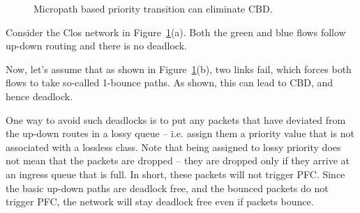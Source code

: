 \begin{figure}[t]
	\centering
	

	
	
	\caption{Micropath based priority transition can eliminate CBD.}\label{fig:priority_transition}
\end{figure}

Consider the Clos network in Figure~\ref{fig:priority_transition}(a). Both the
green and blue flows follow up-down routing and there is no deadlock. 

Now, let's assume that as shown in Figure~\ref{fig:priority_transition}(b), two
links fail, which forces both flows to take so-called 1-bounce paths. As shown,
this can lead to CBD, and hence deadlock.

One way to avoid such deadlocks is to put any packets that have deviated from
the up-down routes in a lossy queue -- i.e. assign them a priority value that is
not associated with a lossless class.  Note that being assigned to lossy
priority does not mean that the packets are dropped -- they are dropped only if
they arrive at an ingress queue that is full. In short, these packets will not
trigger PFC. Since the basic up-down paths are deadlock free, and the bounced
packets do not trigger PFC, the network will stay deadlock free even if packets
bounce.

